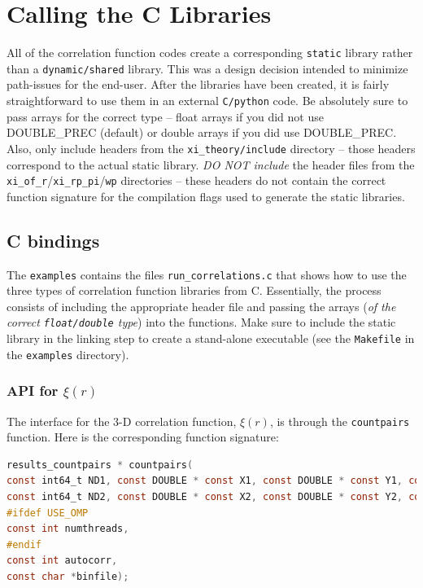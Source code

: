 \documentclass[12pt,titlepage,justified]{article}
\newcommand{\xir}{\ensuremath{{\xi(r)}}\xspace}
\begin{document}
\section{Calling the C Libraries}
All of the correlation function codes create a corresponding \texttt{static} library rather than a \texttt{dynamic/shared} library. This was a design decision intended 
to minimize path-issues for the end-user. After the libraries have been created, it is fairly straightforward to use them in an external \texttt{C/python} code.  
Be absolutely sure to pass arrays for the correct type -- float arrays if you did not use DOUBLE\_PREC (default) or double arrays if you did use DOUBLE\_PREC. 
Also, only include headers from the \texttt{xi\_theory/include} directory -- those headers correspond to the actual static library. {\em DO NOT include} 
the header files from the \texttt{xi\_of\_r}/\texttt{xi\_rp\_pi}/\texttt{wp} directories -- these headers do not contain the correct function signature for 
the compilation flags used to generate the static libraries. 

\subsection{C bindings}
The \texttt{examples} contains the files \texttt{run\_correlations.c} that shows how to use the three types of correlation function libraries from C. Essentially, the process 
consists of including the appropriate header file and passing the arrays ({\em of the correct \texttt{float/double} type}) into the functions. Make sure to include the static 
library in the linking step to create a stand-alone executable (see the \texttt{Makefile} in the \texttt{examples} directory). 

\subsubsection{API for \texorpdfstring{\xir}{xi(r)}}
The interface for the 3-D correlation function, \xir, is through the \texttt{countpairs} function. Here is 
the corresponding function signature:
\begin{lstlisting}[language=C,numbers=none,label={code:API_DD},basicstyle=\scriptsize,caption={API for the 3-D \xir}]
results_countpairs * countpairs(
const int64_t ND1, const DOUBLE * const X1, const DOUBLE * const Y1, const DOUBLE  * const Z1,
const int64_t ND2, const DOUBLE * const X2, const DOUBLE * const Y2, const DOUBLE  * const Z2,
#ifdef USE_OMP
const int numthreads,
#endif
const int autocorr,
const char *binfile);
\end{lstlisting}
\end{document}
